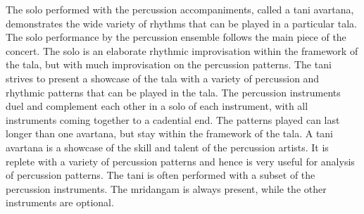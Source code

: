 The solo performed with the percussion accompaniments, called a \gls{tani avartana}, demonstrates the wide variety of rhythms that can be played in a particular \gls{tala}. The solo performance by the percussion ensemble follows the main piece of the concert. The solo is an elaborate rhythmic improvisation within the framework of the \gls{tala}, but with much improvisation on the percussion patterns. The \gls{tani} strives to present a showcase of the \gls{tala} with a variety of percussion and rhythmic patterns that can be played in the tala. The percussion instruments duel and complement each other in a solo of each instrument, with all instruments coming together to a cadential end. The patterns played can last longer than one \gls{avartana}, but stay within the framework of the \gls{tala}. A \gls{tani avartana} is a showcase of the skill and talent of the percussion artists. It is replete with a variety of percussion patterns and hence is very useful for analysis of percussion patterns. The tani is often performed with a subset of the percussion instruments. The mridangam is always present, while the other instruments are optional. 
